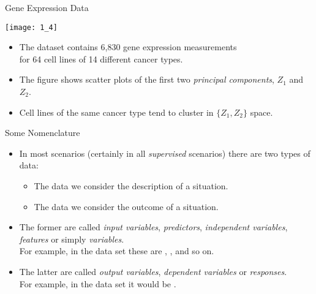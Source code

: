 \documentclass[mathserif, aspectratio=169]{beamer}
\begin{document}
\begin{frame}{Gene Expression Data}
	\vspace{-3mm}
	\begin{center}
		\texttt{[image: 1\_4]}
	\end{center}
	\vspace{-3mm}
	\begin{itemize}
		\item The  dataset contains 6,830 gene expression measurements \\
			for 64 cell lines of 14 different cancer types.
		\item The figure shows scatter plots of the first two \emph{principal components}, $Z_1$ and $Z_2$. 
		\item Cell lines of the same cancer type tend to cluster in $\{Z_1, Z_2\}$ space.
	\end{itemize}
\end{frame}

\begin{frame}{Some Nomenclature}
	\begin{itemize}
		\item In most scenarios (certainly in all \emph{supervised} scenarios) there are two types of data:
			\begin{itemize}
				\item The data we consider the description of a situation.
				\item The data we consider the outcome of a situation.
			\end{itemize}
		\item The former are called \emph{input variables}, \emph{predictors}, \emph{independent variables}, \\
			\emph{features} or simply \emph{variables}.\\
			For example, in the  data set these are , ,  and so on.
		\item The latter are called \emph{output variables}, \emph{dependent variables} or \emph{responses}.\\
			For example, in the  data set it would be .
	\end{itemize}
\end{frame}
\end{document}
